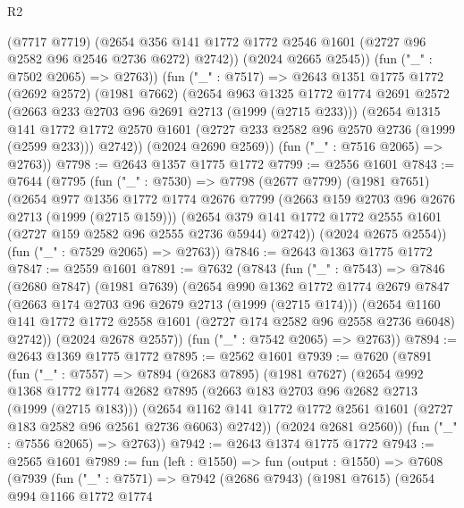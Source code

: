 \begin{lexlean}{R2}
\begin{coremodule}
            (@7717 @7719)
            (@2654 @356 @141 @1772 @1772 @2546 @1601 (@2727 @96 @2582 @96 @2546 @2736 @6272) @2742))
          (@2024 @2665 @2545))
        (fun ("_" : @7502 @2065) => @2763))
      (fun ("_" : @7517) =>
      @2643
        @1351
        @1775
        @1772
        (@2692 @2572)
        (@1981 @7662)
        (@2654
          @963
          @1325
          @1772
          @1774
          @2691
          @2572
          (@2663 @233 @2703 @96 @2691 @2713 (@1999 (@2715 @233)))
          (@2654
            @1315
            @141
            @1772
            @1772
            @2570
            @1601
            (@2727 @233 @2582 @96 @2570 @2736 (@1999 (@2599 @233)))
            @2742))
        (@2024 @2690 @2569))
      (fun ("_" : @7516 @2065) => @2763))
@7798 := @2643 @1357 @1775 @1772
@7799 := @2556 @1601
@7843 := @7644
    (@7795
      (fun ("_" : @7530) =>
      @7798
        (@2677 @7799)
        (@1981 @7651)
        (@2654
          @977
          @1356
          @1772
          @1774
          @2676
          @7799
          (@2663 @159 @2703 @96 @2676 @2713 (@1999 (@2715 @159)))
          (@2654 @379 @141 @1772 @1772 @2555 @1601 (@2727 @159 @2582 @96 @2555 @2736 @5944) @2742))
        (@2024 @2675 @2554))
      (fun ("_" : @7529 @2065) => @2763))
@7846 := @2643 @1363 @1775 @1772
@7847 := @2559 @1601
@7891 := @7632
    (@7843
      (fun ("_" : @7543) =>
      @7846
        (@2680 @7847)
        (@1981 @7639)
        (@2654
          @990
          @1362
          @1772
          @1774
          @2679
          @7847
          (@2663 @174 @2703 @96 @2679 @2713 (@1999 (@2715 @174)))
          (@2654 @1160 @141 @1772 @1772 @2558 @1601 (@2727 @174 @2582 @96 @2558 @2736 @6048) @2742))
        (@2024 @2678 @2557))
      (fun ("_" : @7542 @2065) => @2763))
@7894 := @2643 @1369 @1775 @1772
@7895 := @2562 @1601
@7939 := @7620
    (@7891
      (fun ("_" : @7557) =>
      @7894
        (@2683 @7895)
        (@1981 @7627)
        (@2654
          @992
          @1368
          @1772
          @1774
          @2682
          @7895
          (@2663 @183 @2703 @96 @2682 @2713 (@1999 (@2715 @183)))
          (@2654 @1162 @141 @1772 @1772 @2561 @1601 (@2727 @183 @2582 @96 @2561 @2736 @6063) @2742))
        (@2024 @2681 @2560))
      (fun ("_" : @7556 @2065) => @2763))
@7942 := @2643 @1374 @1775 @1772
@7943 := @2565 @1601
@7989 := fun (left : @1550) =>
  fun (output : @1550) =>
  @7608
    (@7939
      (fun ("_" : @7571) =>
      @7942
        (@2686 @7943)
        (@1981 @7615)
        (@2654
          @994
          @1166
          @1772
          @1774

\end{coremodule}
\end{lexlean}
